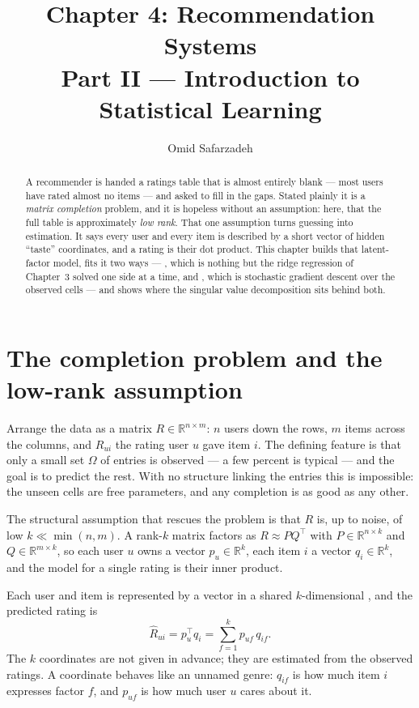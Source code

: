 \documentclass[11pt]{article}
\title{Chapter 4: Recommendation Systems \\ \large Part II --- Introduction to Statistical Learning}
\author{Omid Safarzadeh}
\date{}
\begin{document}
\maketitle

\begin{abstract}
\noindent
A recommender is handed a ratings table that is almost entirely blank --- most
users have rated almost no items --- and asked to fill in the gaps. Stated
plainly it is a \emph{matrix completion} problem, and it is hopeless without an
assumption: here, that the full table is approximately \emph{low rank}. That one
assumption turns guessing into estimation. It says every user and every item is
described by a short vector of hidden ``taste'' coordinates, and a rating is
their dot product. This chapter builds that latent-factor model, fits it two
ways --- , which is nothing but the ridge
regression of Chapter~3 solved one side at a time, and , which
is stochastic gradient descent over the observed cells --- and shows where the
singular value decomposition sits behind both.
\end{abstract}

\tableofcontents

\section{The completion problem and the low-rank assumption}

Arrange the data as a matrix $R\in\mathbb{R}^{n\times m}$: $n$ users down the
rows, $m$ items across the columns, and $R_{ui}$ the rating user $u$ gave item
$i$. The defining feature is that only a small set $\Omega$ of entries is
observed --- a few percent is typical --- and the goal is to predict the rest.
With no structure linking the entries this is impossible: the unseen cells are
free parameters, and any completion is as good as any other.

The structural assumption that rescues the problem is that $R$ is, up to noise,
of low  $k\ll \min(n,m)$. A rank-$k$ matrix factors as
$R\approx PQ^\top$ with $P\in\mathbb{R}^{n\times k}$ and $Q\in\mathbb{R}^{m\times
k}$, so each user $u$ owns a vector $p_u\in\mathbb{R}^k$, each item $i$ a vector
$q_i\in\mathbb{R}^k$, and the model for a single rating is their inner product.

\begin{definition}
Each user and item is represented by a vector in a shared $k$-dimensional
, and the predicted rating is
\[
  \hat R_{ui} = p_u^\top q_i = \sum_{f=1}^{k} p_{uf}\,q_{if}.
\]
The $k$ coordinates are not given in advance; they are estimated from the
observed ratings. A coordinate behaves like an unnamed genre: $q_{if}$ is how
much item $i$ expresses factor $f$, and $p_{uf}$ is how much user $u$ cares about
it.
\end{definition}
\end{document}
